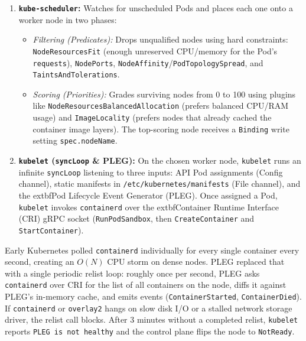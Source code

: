 \begin{enumerate}[leftmargin=15pt]
  \item \textbf{\texttt{kube-scheduler}:} Watches for unscheduled Pods and places each one onto a worker node in two phases:
  \begin{itemize}[leftmargin=10pt]
    \item \emph{Filtering (Predicates):} Drops unqualified nodes using hard constraints: \texttt{NodeResourcesFit} (enough unreserved CPU/memory for the Pod's \texttt{requests}), \texttt{NodePorts}, \texttt{NodeAffinity}/\texttt{PodTopologySpread}, and \texttt{TaintsAndTolerations}.
    \item \emph{Scoring (Priorities):} Grades surviving nodes from 0 to 100 using plugins like \texttt{NodeResourcesBalancedAllocation} (prefers balanced CPU/RAM usage) and \texttt{ImageLocality} (prefers nodes that already cached the container image layers). The top-scoring node receives a \texttt{Binding} write setting \texttt{spec.nodeName}.
  \end{itemize}
  \item \textbf{\texttt{kubelet} (\texttt{syncLoop} \& PLEG):} On the chosen worker node, \texttt{kubelet} runs an infinite \texttt{syncLoop} listening to three inputs: API Pod assignments (Config channel), static manifests in \texttt{/etc/kubernetes/manifests} (File channel), and the 	extbf{Pod Lifecycle Event Generator (PLEG)}. Once assigned a Pod, \texttt{kubelet} invokes \texttt{containerd} over the 	extbf{Container Runtime Interface (CRI)} gRPC socket (\texttt{RunPodSandbox}, then \texttt{CreateContainer} and \texttt{StartContainer}).
\end{enumerate}

\begin{underthehoodbox}
Early Kubernetes polled \texttt{containerd} individually for every single container every second, creating an $O(N)$ CPU storm on dense nodes. PLEG replaced that with a single periodic relist loop: roughly once per second, PLEG asks \texttt{containerd} over CRI for the list of all containers on the node, diffs it against PLEG's in-memory cache, and emits events (\texttt{ContainerStarted}, \texttt{ContainerDied}). If \texttt{containerd} or \texttt{overlay2} hangs on slow disk I/O or a stalled network storage driver, the relist call blocks. After 3 minutes without a completed relist, \texttt{kubelet} reports \texttt{PLEG is not healthy} and the control plane flips the node to \texttt{NotReady}.
\end{underthehoodbox}

